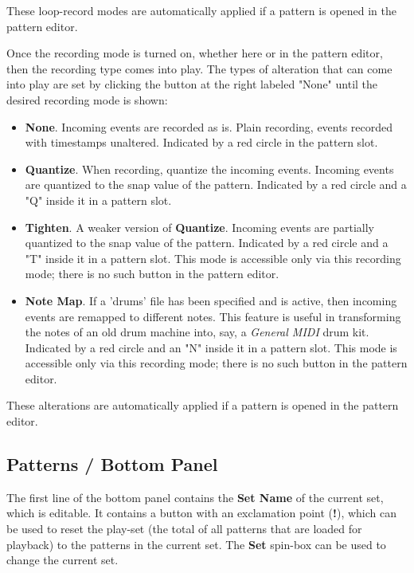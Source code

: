    These loop-record modes are automatically applied if a pattern is opened
   in the pattern editor.

   Once the recording mode is turned on, whether here or in the pattern editor,
   then the recording type comes into play.
   The types of alteration that can come into play are set by clicking the
   button at the right labeled "None" until the desired recording mode
   is shown:

   \begin{itemize}
      \item \textbf{None}.
         Incoming events are recorded as is.
         Plain recording, events recorded with timestamps unaltered.
         Indicated by a red circle in the pattern slot.
      \item \textbf{Quantize}.
         When recording, quantize the incoming events.
         Incoming events are quantized to the snap value of the pattern.
         Indicated by a red circle and a "Q" inside it in a pattern slot.
      \item \textbf{Tighten}.
         A weaker version of \textbf{Quantize}.
         Incoming events are partially quantized to the snap value of the
         pattern.
         Indicated by a red circle and a "T" inside it in a pattern slot.
         This mode is accessible only via this recording mode; there
         is no such button in the pattern editor.
      \item \textbf{Note Map}.
         If a 'drums' file has been specified and is active, then
         incoming events are remapped to different notes.
         This feature is useful in transforming the notes of an old
         drum machine into, say, a \textsl{General MIDI} drum kit.
         Indicated by a red circle and an "N" inside it in a pattern slot.
         This mode is accessible only via this recording mode; there
         is no such button in the pattern editor.
   \end{itemize}

   These alterations are automatically applied if a pattern is opened
   in the pattern editor.

\subsection{Patterns / Bottom Panel}
\label{subsec:patterns_panel_bottom}

   The first line of the bottom panel contains the \textbf{Set Name}
   of the current set, which is editable.
   It contains a button with an exclamation point (\textbf{!}), which
   can be used to reset the play-set (the total of all patterns that are loaded
   for playback) to the patterns in the current set.
   The \textbf{Set} spin-box can be used to change the current set.

